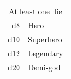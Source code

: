 \begin{tabular}{rl}
\multicolumn{2}{c}{At least one die}\\
d8 & Hero \\
d10 & Superhero \\
d12 & Legendary \\
d20 & Demi-god \\
\end{tabular}